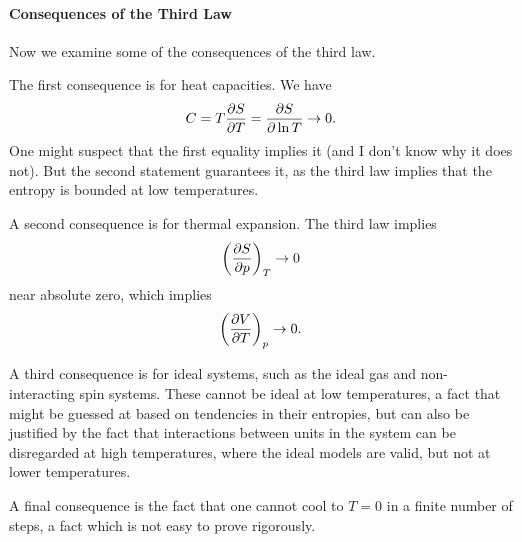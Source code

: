 \paragraph{Consequences of the Third Law}
Now we examine some of the consequences of the third law.

The first consequence is for heat capacities. We have
\begin{align*}
	C = T\pdv{S}{T} = \pdv{S}{\ln{T}} \to 0.
\end{align*}
One might suspect that the first equality implies it (and I don't know why it does not). But the second statement guarantees it, as the third law implies that the entropy is bounded at low temperatures.

A second consequence is for thermal expansion. The third law implies
\begin{align*}
	\left(\pdv{S}{p}\right)_{T} \to 0
\end{align*}
near absolute zero, which implies
\begin{align*}
	\left(\pdv{V}{T}\right)_{p} \to 0.
\end{align*}

A third consequence is for ideal systems, such as the ideal gas and non-interacting spin systems. These cannot be ideal at low temperatures, a fact that might be guessed at based on tendencies in their entropies, but can also be justified by the fact that interactions between units in the system can be disregarded at high temperatures, where the ideal models are valid, but not at lower temperatures.

A final consequence is the fact that one cannot cool to $T = 0$ in a finite number of steps, a fact which is not easy to prove rigorously.

